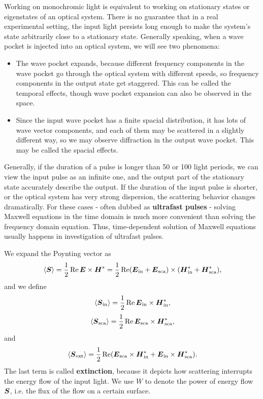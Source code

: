 \documentclass[hyperref, a4paper]{article}
\newcommand*{\concept}[1]{{\textbf{#1}}}
\begin{document}
\begin{note*}{}{}
    Working on monochromic light is equivalent to working on stationary states or eigenstates of an optical system.
    There is no guarantee that in a real experimental setting, the input light persists long enough 
    to make the system's state arbitrarily close to a stationary state.
    Generally speaking, when a wave pocket is injected into an optical system, 
    we will see two phenomena: 
    \begin{itemize}
        \item The wave pocket expands, because different frequency components in the wave pocket go through
        the optical system with different speeds, so frequency components in the output state get staggered.
        This can be called the temporal effects, though wave pocket expansion can also be observed in the space.
        \item Since the input wave pocket has a finite spacial distribution, it has lots of wave vector
        components, and each of them may be scattered in a slightly different way, so we may observe 
        diffraction in the output wave pocket. This may be called the spacial effects. 
    \end{itemize}
    Generally, if the duration of a pulse is longer than 50 or 100 light periods, we can view the input 
    pulse as an infinite one, and the output part of the stationary state accurately describe the output.
    If the duration of the input pulse is shorter, or the optical system has very strong dispersion,
    the scattering behavior changes dramatically.
    For these cases - often dubbed as \concept{ultrafast pulses} - solving Maxwell equations in the time 
    domain is much more convenient than solving the frequency domain equation.
    Thus, time-dependent solution of Maxwell equations usually happens in investigation of ultrafast pulses.
\end{note*}

We expand the Poynting vector as  
\[
    \expval*{\vb*{S}} = \frac{1}{2} \Re \vb*{E} \times \vb*{H}^* 
    = \frac{1}{2} \Re (\vb*{E}_\text{in} + \vb*{E}_\text{sca}) \times (\vb*{H}_\text{in}^* + \vb*{H}_\text{sca}^*),
\]
and we define 
\begin{equation}
    \expval*{\vb*{S}_\text{in}} = \frac{1}{2} \Re \vb*{E}_\text{in} \times \vb*{H}_\text{in}^*,
\end{equation}
\begin{equation}
    \expval*{\vb*{S}_\text{sca}} = \frac{1}{2} \Re \vb*{E}_\text{sca} \times \vb*{H}_\text{sca}^*,
\end{equation}
and 
\begin{equation}
    \expval*{\vb*{S}_\text{ext}} = \frac{1}{2} \Re (\vb*{E}_\text{sca} \times \vb*{H}_\text{in}^* + \vb*{E}_\text{in} \times \vb*{H}_\text{sca}^*).
\end{equation}
The last term is called \concept{extinction}, because it depicts how scattering interrupts the energy flow of 
the input light. We use $W$ to denote the power of energy flow $\vb*{S}$, i.e. the flux of the flow on a certain 
surface.
\end{document}
